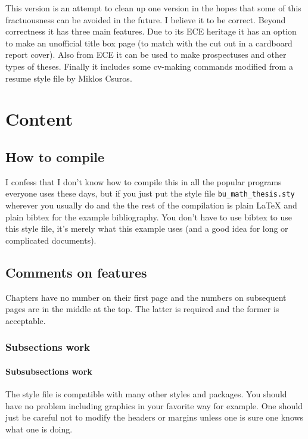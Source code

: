 \documentclass[11pt]{report}
\begin{document}
This version is an attempt to clean up one version in the hopes that
some of this fractuousness can be avoided in the future.  I believe it
to be correct.  Beyond correctness it has three main features.  Due to its
ECE heritage it has an option to make an unofficial title box page (to
match with the cut out in a cardboard report cover).  Also from ECE it
can be used to make prospectuses and other types of theses.  Finally
it includes some cv-making commands modified from a resume style file
by Miklos Csuros.

\chapter{Content}

\section{How to compile}

I confess that I don't know how to compile this in all the popular
programs everyone uses these days, but if you just put the style file
\verb+bu_math_thesis.sty+ wherever you usually do and the the rest
of the compilation is plain {\LaTeX} and plain bibtex for the example
bibliography.  You don't have to use bibtex to use this style file,
it's merely what this example uses (and a good idea for long or
complicated documents).

\section{Comments on features}

Chapters have no number on their first page and the numbers on
subsequent pages are in the middle at the top.  The latter is required
and the former is acceptable. 

\subsection{Subsections work}
\subsubsection{Subsubsections work}

The style file is compatible with many other styles and packages.  You
should have no problem including graphics in your favorite way for
example.  One should just be careful not to modify the headers or
margins unless one 
is sure one knows what one is doing.
\end{document}
